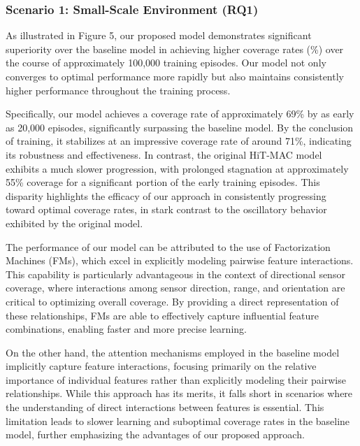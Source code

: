 \documentclass[preprint,12pt]{elsarticle}
\begin{document}
\subsubsection{Scenario 1: Small-Scale Environment (RQ1)}
%     
As illustrated in Figure 5, our proposed model demonstrates significant superiority over the baseline model in achieving higher coverage rates (\%) over the course of approximately 100,000 training episodes. Our model not only converges to optimal performance more rapidly but also maintains consistently higher performance throughout the training process.

Specifically, our model achieves a coverage rate of approximately 69\% by as early as 20,000 episodes, significantly surpassing the baseline model. By the conclusion of training, it stabilizes at an impressive coverage rate of around 71\%, indicating its robustness and effectiveness. In contrast, the original HiT-MAC model exhibits a much slower progression, with prolonged stagnation at approximately 55\% coverage for a significant portion of the early training episodes. This disparity highlights the efficacy of our approach in consistently progressing toward optimal coverage rates, in stark contrast to the oscillatory behavior exhibited by the original model.

The performance of our model can be attributed to the use of Factorization Machines (FMs), which excel in explicitly modeling pairwise feature interactions. This capability is particularly advantageous in the context of directional sensor coverage, where interactions among sensor direction, range, and orientation are critical to optimizing overall coverage. By providing a direct representation of these relationships, FMs are able to effectively capture influential feature combinations, enabling faster and more precise learning.

On the other hand, the attention mechanisms employed in the baseline model implicitly capture feature interactions, focusing primarily on the relative importance of individual features rather than explicitly modeling their pairwise relationships. While this approach has its merits, it falls short in scenarios where the understanding of direct interactions between features is essential. This limitation leads to slower learning and suboptimal coverage rates in the baseline model, further emphasizing the advantages of our proposed approach.
\end{document}
